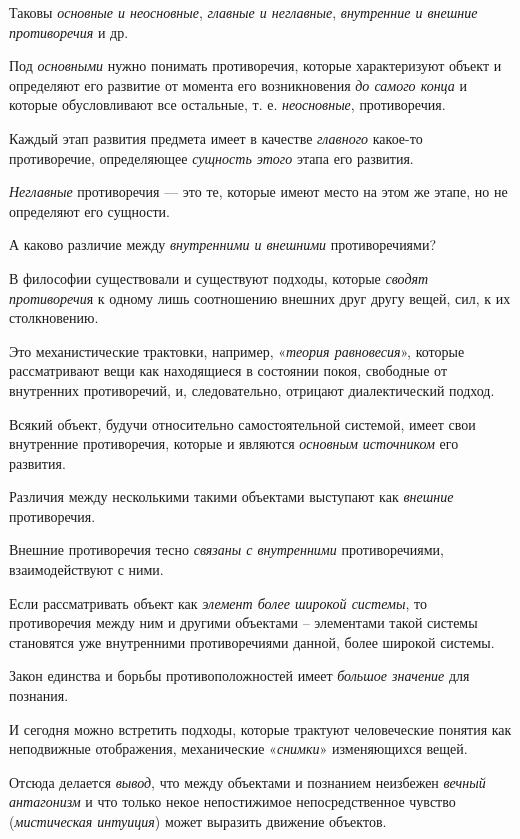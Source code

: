 \documentclass[a4paper,14pt,russian]{extreport}
\begin{document}
Таковы \emph{основные и неосновные}, \emph{главные и неглавные}, \emph{внутренние и внешние противоречия} и др.

Под \emph{основными} нужно понимать противоречия, которые характеризуют объект и определяют его развитие от момента его возникновения \emph{до самого конца} и которые обусловливают все остальные, т. е. \emph{неосновные}, противоречия.

Каждый этап развития предмета имеет в качестве \emph{главного} какое-то противоречие, определяющее \emph{сущность этого} этапа его развития.

\emph{Неглавные} противоречия --- это те, которые имеют место на этом же этапе, но не определяют его сущности.

А каково различие между \emph{внутренними и внешними} противоречиями?

В философии существовали и существуют подходы, которые \emph{сводят противоречи}я к одному лишь соотношению внешних друг другу вещей, сил, к их столкновению.

Это механистические трактовки, например, «\emph{теория равновесия}», которые рассматривают вещи как находящиеся в состоянии покоя, свободные от внутренних противоречий, и, следовательно, отрицают диалектический подход.

Всякий объект, будучи относительно самостоятельной системой, имеет свои внутренние противоречия, которые и являются \emph{основным источником} его развития.

Различия между несколькими такими объектами выступают как \emph{внешние} противоречия.

Внешние противоречия тесно \emph{связаны с внутренними} противоречиями, взаимодействуют с ними.

Если рассматривать объект как \emph{элемент более широкой системы}, то противоречия между ним и другими объектами -- элементами такой системы становятся уже внутренними противоречиями данной, более широкой системы.

Закон единства и борьбы противоположностей имеет \emph{большое значение} для познания.

И сегодня можно встретить подходы, которые трактуют человеческие понятия как неподвижные отображения, механические «\emph{снимки}» изменяющихся вещей.

Отсюда делается \emph{вывод}, что между объектами и познанием неизбежен \emph{вечный антагонизм} и что только некое непостижимое непосредственное чувство (\emph{мистическая интуиция}) может выразить движение объектов.
\end{document}
